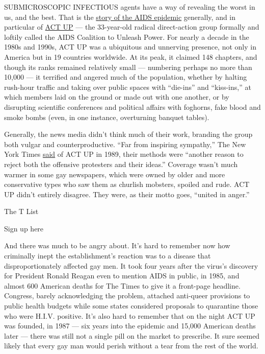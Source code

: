 SUBMICROSCOPIC INFECTIOUS agents have a way of revealing the worst in
us, and the best. That is the
\href{https://www.nytimes3xbfgragh.onion/2018/04/27/t-magazine/times-journalists-aids-gay-history.html}{story
of the AIDS epidemic} generally, and in particular of
\href{https://actupny.com/}{ACT UP} --- the 33-year-old radical
direct-action group formally and loftily called the AIDS Coalition to
Unleash Power. For nearly a decade in the 1980s and 1990s, ACT UP was a
ubiquitous and unnerving presence, not only in America but in 19
countries worldwide. At its peak, it claimed 148 chapters, and though
its ranks remained relatively small --- numbering perhaps no more than
10,000 --- it terrified and angered much of the population, whether by
halting rush-hour traffic and taking over public spaces with ``die-ins''
and ``kiss-ins,'' at which members laid on the ground or made out with
one another, or by disrupting scientific conferences and political
affairs with foghorns, fake blood and smoke bombs (even, in one
instance, overturning banquet tables).

Generally, the news media didn't think much of their work, branding the
group both vulgar and counterproductive. ``Far from inspiring
sympathy,'' The New York Times
\href{https://www.nytimes3xbfgragh.onion/1989/12/12/opinion/the-storming-of-st-pat-s.html}{said}
of ACT UP in 1989, their methods were ``another reason to reject both
the offensive protesters and their ideas.'' Coverage wasn't much warmer
in some gay newspapers, which were owned by older and more conservative
types who saw them as churlish mobsters, spoiled and rude. ACT UP didn't
entirely disagree. They were, as their motto goes, ``united in anger.''

The T List \textbar{}

Sign up here

And there was much to be angry about. It's hard to remember now how
criminally inept the establishment's reaction was to a disease that
disproportionately affected gay men. It took four years after the
virus's discovery for President Ronald Reagan even to mention AIDS in
public, in 1985, and almost 600 American deaths for The Times to give it
a front-page headline. Congress, barely acknowledging the problem,
attached anti-queer provisions to public health budgets while some
states considered proposals to quarantine those who were H.I.V.
positive. It's also hard to remember that on the night ACT UP was
founded, in 1987 --- six years into the epidemic and 15,000 American
deaths later --- there was still not a single pill on the market to
prescribe. It sure seemed likely that every gay man would perish without
a tear from the rest of the world.

